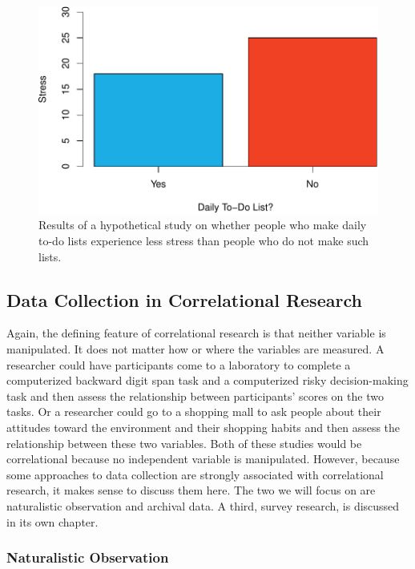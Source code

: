 \documentclass[
]{krantz}
\begin{document}
\begin{figure}

{\centering \includegraphics[width=0.8\linewidth]{09-nonexperiments_files/figure-latex/todo-1} 

}

\caption{Results of a hypothetical study on whether people who make daily to-do lists experience less stress than people who do not make such lists.}\label{fig:todo}
\end{figure}

\hypertarget{data-collection-in-correlational-research}{%
\subsection*{Data Collection in Correlational Research}\label{data-collection-in-correlational-research}}


Again, the defining feature of correlational research is that neither variable is manipulated. It does not matter how or where the variables are measured. A researcher could have participants come to a laboratory to complete a computerized backward digit span task and a computerized risky decision-making task and then assess the relationship between participants' scores on the two tasks. Or a researcher could go to a shopping mall to ask people about their attitudes toward the environment and their shopping habits and then assess the relationship between these two variables. Both of these studies would be correlational because no independent variable is manipulated. However, because some approaches to data collection are strongly associated with correlational research, it makes sense to discuss them here. The two we will focus on are naturalistic observation and archival data. A third, survey research, is discussed in its own chapter.

\hypertarget{naturalistic-observation}{%
\subsubsection*{Naturalistic Observation}\label{naturalistic-observation}}
\end{document}

